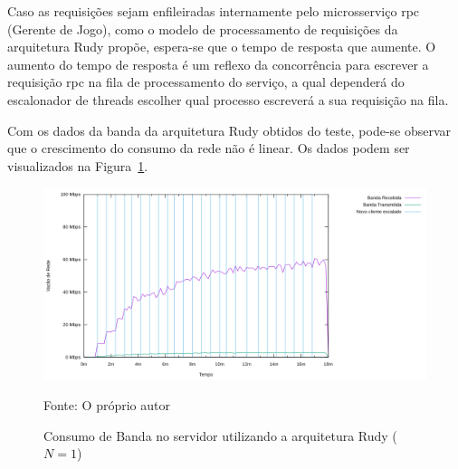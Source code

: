 Caso as requisições sejam enfileiradas internamente pelo microsserviço \ac{rpc} (Gerente de Jogo), como o modelo de processamento de requisições da arquitetura Rudy propõe, espera-se que o tempo de resposta que aumente.
%
O aumento do tempo de resposta é um reflexo da concorrência para escrever a requisição \ac{rpc} na fila de processamento do serviço, a qual dependerá do escalonador de threads escolher qual processo escreverá a sua requisição na fila.

Com os dados da banda da arquitetura Rudy obtidos do teste, pode-se observar que o crescimento do consumo da rede não é linear.
%
Os dados podem ser visualizados na Figura~\ref{fig:rudy_t4_io}.

\begin{figure}[htb!]
    \caption{Consumo de Banda no servidor utilizando a arquitetura Rudy ($N=1$)}
    \label{fig:rudy_t4_io}
    \includegraphics[width=\textwidth]{metricas_rudy_t4/io.png}
    \centering
    
    Fonte: O próprio autor
\end{figure}

